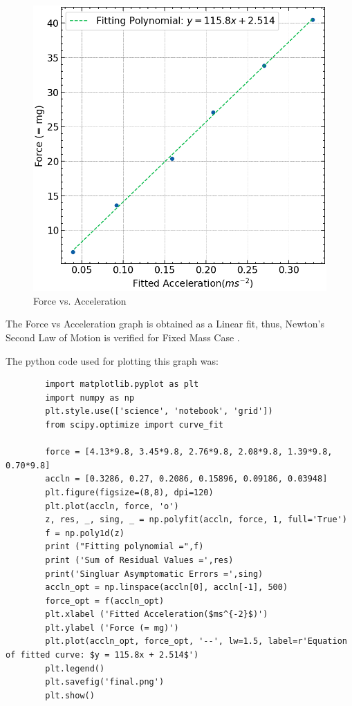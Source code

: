 \documentclass{article}
\begin{document}
 	\begin{figure}[H]
 		\centering
 		\includegraphics[scale=0.8]{final.png}
 		\caption{Force vs. Acceleration}
 		\label{figure:force}%
 	\end{figure}
 
 	The Force vs Acceleration graph is obtained as a Linear fit, thus, Newton’s Second Law 
 	of Motion is verified for Fixed Mass Case .
 
 	The python code used for plotting this graph was:
 	
 	\begin{lstlisting}
 		import matplotlib.pyplot as plt
 		import numpy as np
 		plt.style.use(['science', 'notebook', 'grid'])
 		from scipy.optimize import curve_fit
 		
 		force = [4.13*9.8, 3.45*9.8, 2.76*9.8, 2.08*9.8, 1.39*9.8, 0.70*9.8]
 		accln = [0.3286, 0.27, 0.2086, 0.15896, 0.09186, 0.03948]
 		plt.figure(figsize=(8,8), dpi=120)
 		plt.plot(accln, force, 'o')
 		z, res, _, sing, _ = np.polyfit(accln, force, 1, full='True')
 		f = np.poly1d(z)
 		print ("Fitting polynomial =",f)
 		print ('Sum of Residual Values =',res)
 		print('Singluar Asymptomatic Errors =',sing)
 		accln_opt = np.linspace(accln[0], accln[-1], 500)
 		force_opt = f(accln_opt)
 		plt.xlabel ('Fitted Acceleration($ms^{-2}$)')
 		plt.ylabel ('Force (= mg)')
 		plt.plot(accln_opt, force_opt, '--', lw=1.5, label=r'Equation of fitted curve: $y = 115.8x + 2.514$')
 		plt.legend()
 		plt.savefig('final.png')
 		plt.show()
 	\end{lstlisting}
 
\end{document}
